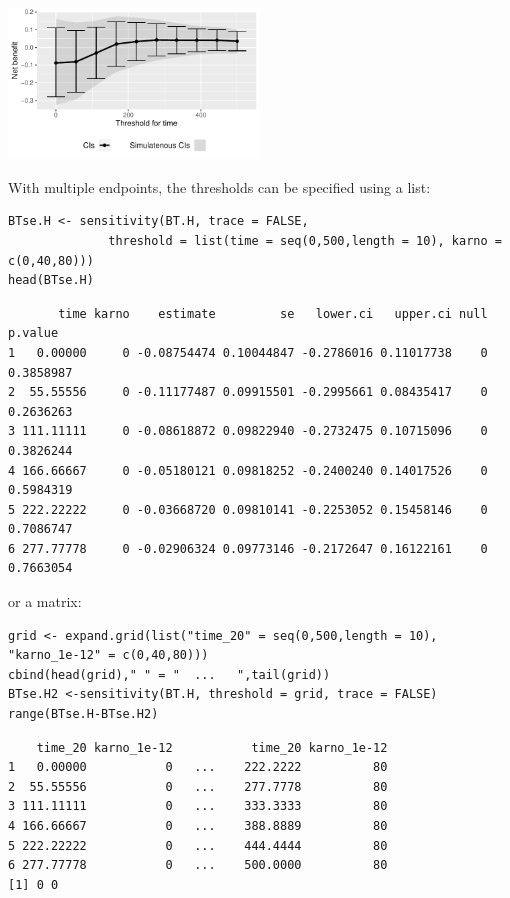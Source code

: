 \documentclass[12pt]{article}
\begin{document}
\begin{center}
\includegraphics[width=0.5\textwidth]{./figures/gg-sensitivity1.pdf}
\end{center}

With multiple endpoints, the thresholds can be specified using a list:
\lstset{language=r,label= ,caption= ,captionpos=b,numbers=none}
\begin{lstlisting}
BTse.H <- sensitivity(BT.H, trace = FALSE,
		      threshold = list(time = seq(0,500,length = 10), karno = c(0,40,80)))
head(BTse.H)
\end{lstlisting}

\begin{verbatim}
       time karno    estimate         se   lower.ci   upper.ci null   p.value
1   0.00000     0 -0.08754474 0.10044847 -0.2786016 0.11017738    0 0.3858987
2  55.55556     0 -0.11177487 0.09915501 -0.2995661 0.08435417    0 0.2636263
3 111.11111     0 -0.08618872 0.09822940 -0.2732475 0.10715096    0 0.3826244
4 166.66667     0 -0.05180121 0.09818252 -0.2400240 0.14017526    0 0.5984319
5 222.22222     0 -0.03668720 0.09810141 -0.2253052 0.15458146    0 0.7086747
6 277.77778     0 -0.02906324 0.09773146 -0.2172647 0.16122161    0 0.7663054
\end{verbatim}


or a matrix:

\lstset{language=r,label= ,caption= ,captionpos=b,numbers=none}
\begin{lstlisting}
grid <- expand.grid(list("time_20" = seq(0,500,length = 10), "karno_1e-12" = c(0,40,80)))
cbind(head(grid)," " = "  ...   ",tail(grid))
BTse.H2 <-sensitivity(BT.H, threshold = grid, trace = FALSE)
range(BTse.H-BTse.H2)
\end{lstlisting}

\begin{verbatim}
    time_20 karno_1e-12           time_20 karno_1e-12
1   0.00000           0   ...    222.2222          80
2  55.55556           0   ...    277.7778          80
3 111.11111           0   ...    333.3333          80
4 166.66667           0   ...    388.8889          80
5 222.22222           0   ...    444.4444          80
6 277.77778           0   ...    500.0000          80
[1] 0 0
\end{verbatim}
\end{document}
